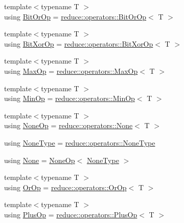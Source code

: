 \begin{DoxyCompactItemize}
{\footnotesize template$<$typename T $>$ }\\using \hyperlink{namespacevt_1_1collective_a07085d466f47337de6f1d6ea30023c11}{Bit\+Or\+Op} = \hyperlink{structvt_1_1collective_1_1reduce_1_1operators_1_1_bit_or_op}{reduce\+::operators\+::\+Bit\+Or\+Op}$<$ T $>$
\item 
{\footnotesize template$<$typename T $>$ }\\using \hyperlink{namespacevt_1_1collective_a834c8e21559219187ec9ef79f72cf474}{Bit\+Xor\+Op} = \hyperlink{structvt_1_1collective_1_1reduce_1_1operators_1_1_bit_xor_op}{reduce\+::operators\+::\+Bit\+Xor\+Op}$<$ T $>$
\item 
{\footnotesize template$<$typename T $>$ }\\using \hyperlink{namespacevt_1_1collective_aee17b1e7ed3266f7407f01253ecc2807}{Max\+Op} = \hyperlink{structvt_1_1collective_1_1reduce_1_1operators_1_1_max_op}{reduce\+::operators\+::\+Max\+Op}$<$ T $>$
\item 
{\footnotesize template$<$typename T $>$ }\\using \hyperlink{namespacevt_1_1collective_a0d9f013f61a3e2a15a9e0491409f50f2}{Min\+Op} = \hyperlink{structvt_1_1collective_1_1reduce_1_1operators_1_1_min_op}{reduce\+::operators\+::\+Min\+Op}$<$ T $>$
\item 
{\footnotesize template$<$typename T $>$ }\\using \hyperlink{namespacevt_1_1collective_a812e9225d75c8888457b29f971c33f75}{None\+Op} = \hyperlink{structvt_1_1collective_1_1reduce_1_1operators_1_1_none}{reduce\+::operators\+::\+None}$<$ T $>$
\item 
using \hyperlink{namespacevt_1_1collective_af988b64711231f96d33ebfaf891e52a4}{None\+Type} = \hyperlink{namespacevt_1_1collective_1_1reduce_1_1operators_a1e8a587884de5e874a701ee300ca247c}{reduce\+::operators\+::\+None\+Type}
\item 
using \hyperlink{namespacevt_1_1collective_ab9abd77f58f0ede6d24462b95d0a1989}{None} = \hyperlink{namespacevt_1_1collective_a812e9225d75c8888457b29f971c33f75}{None\+Op}$<$ \hyperlink{namespacevt_1_1collective_af988b64711231f96d33ebfaf891e52a4}{None\+Type} $>$
\item 
{\footnotesize template$<$typename T $>$ }\\using \hyperlink{namespacevt_1_1collective_a47e3b11aa019f643f23effceb60ee94a}{Or\+Op} = \hyperlink{structvt_1_1collective_1_1reduce_1_1operators_1_1_or_op}{reduce\+::operators\+::\+Or\+Op}$<$ T $>$
\item 
{\footnotesize template$<$typename T $>$ }\\using \hyperlink{namespacevt_1_1collective_a7a695a8e6ed8247f643918113b7bf881}{Plus\+Op} = \hyperlink{structvt_1_1collective_1_1reduce_1_1operators_1_1_plus_op}{reduce\+::operators\+::\+Plus\+Op}$<$ T $>$
\end{DoxyCompactItemize}
